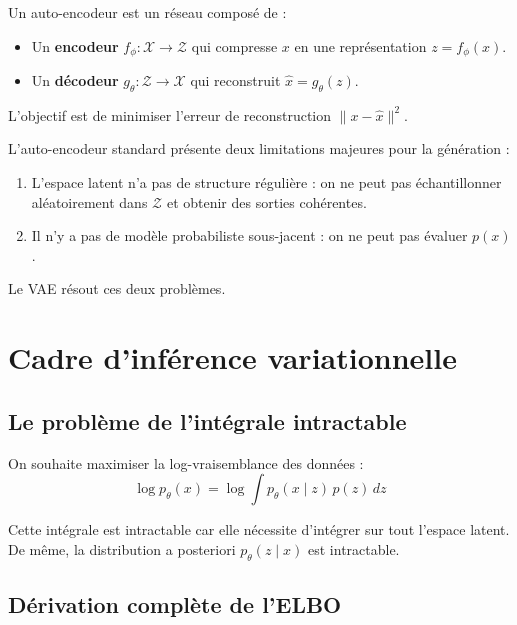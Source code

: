\begin{definition}
Un auto-encodeur est un r\'eseau compos\'e de :
\begin{itemize}
    \item Un \textbf{encodeur} $f_\phi : \mathcal{X} \to \mathcal{Z}$ qui compresse $x$ en une repr\'esentation $z = f_\phi(x)$.
    \item Un \textbf{d\'ecodeur} $g_\theta : \mathcal{Z} \to \mathcal{X}$ qui reconstruit $\hat{x} = g_\theta(z)$.
\end{itemize}
L'objectif est de minimiser l'erreur de reconstruction $\|x - \hat{x}\|^2$.
\end{definition}

\begin{attention}
L'auto-encodeur standard pr\'esente deux limitations majeures pour la g\'en\'eration :
\begin{enumerate}
    \item L'espace latent n'a pas de structure r\'eguli\`ere : on ne peut pas \'echantillonner al\'eatoirement dans $\mathcal{Z}$ et obtenir des sorties coh\'erentes.
    \item Il n'y a pas de mod\`ele probabiliste sous-jacent : on ne peut pas \'evaluer $p(x)$.
\end{enumerate}
Le VAE r\'esout ces deux probl\`emes.
\end{attention}

\section{Cadre d'inf\'erence variationnelle}
\label{sec:variational-inference}

\subsection{Le probl\`eme de l'int\'egrale intractable}

On souhaite maximiser la log-vraisemblance des donn\'ees :
\begin{equation}
\log p_\theta(x) = \log \int p_\theta(x \mid z)\, p(z)\, dz
\end{equation}

Cette int\'egrale est intractable car elle n\'ecessite d'int\'egrer sur tout l'espace latent. De m\^eme, la distribution a posteriori $p_\theta(z \mid x)$ est intractable.

\subsection{D\'erivation compl\`ete de l'ELBO}

